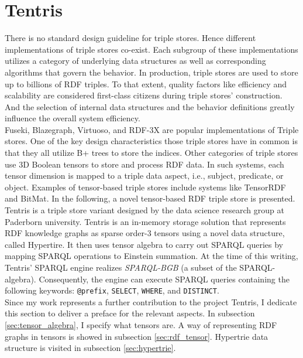 \section{Tentris}
\label{sec:preliminaries:tentris}

There is no standard design guideline for triple stores. Hence different implementations of triple stores co-exist. Each subgroup of these implementations utilizes a category of underlying data structures as well as corresponding algorithms that govern the behavior. 
In production, triple stores are used to store up to billions of RDF triples. 
To that extent, quality factors like efficiency and scalability are considered first-class citizens during triple stores' construction. 
And the selection of internal data structures and the behavior definitions greatly influence the overall system efficiency. \\

Fuseki, Blazegraph, Virtuoso, and RDF-3X are popular implementations of Triple stores. 
One of the key design characteristics those triple stores have in common is that they all utilize B+ trees to store the indices. 
Other categories of triple stores use 3D Boolean tensors to store and process RDF data. In such systems, each tensor dimension is mapped to a triple data aspect, i.e., subject, predicate, or object. Examples of tensor-based triple stores include systems like TensorRDF and BitMat. In the following, a novel tensor-based RDF triple store is presented. \\

Tentris is a triple store variant designed by the data science research group at Paderborn university\cite{tentris2020}. 
Tentris is an in-memory storage solution that represents RDF knowledge graphs as sparse order-3 tensors using a novel data structure, called Hypertire. 
It then uses tensor algebra to carry out SPARQL queries by mapping SPARQL operations to Einstein summation\cite{einstein}. 
At the time of this writing, Tentris' SPARQL engine realizes \textit{SPARQL-BGB}  (a subset of the SPARQL-algebra). 
Consequently, the engine can execute SPARQL queries containing the following keywords: \verb|@prefix|, \verb|SELECT|, \verb|WHERE|, and \verb|DISTINCT|\cite{foundationofthesemanticweb}.  \\

Since my work represents a further contribution to the project Tentris, I dedicate this section to deliver a preface for the relevant aspects. In subsection \ref{sec:tensor_algebra}, I specify what tensors are. A way of representing RDF graphs in tensors is showed in subsection \ref{sec:rdf_tensor}. Hypertrie data structure is visited in subsection \ref{sec:hypertrie}.


